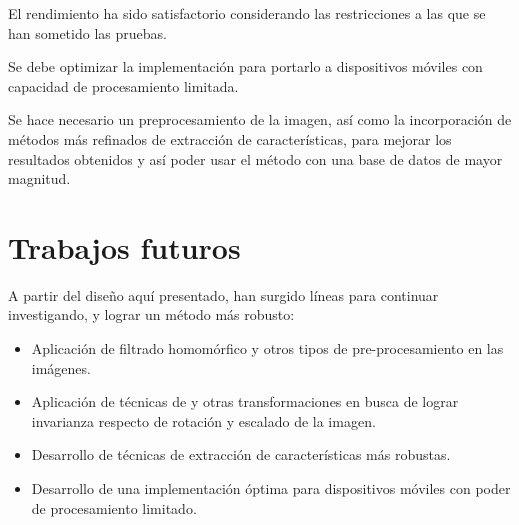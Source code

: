 \documentclass[conference,a4paper,10pt,oneside,final]{tfmpd}
\begin{document}
El rendimiento ha sido satisfactorio considerando las restricciones a las
que se han sometido las pruebas.

Se debe optimizar la implementación para portarlo a dispositivos móviles
con capacidad de procesamiento limitada.

Se hace necesario un preprocesamiento de la imagen, así como la incorporación
de métodos más refinados de extracción de características, para mejorar los
resultados obtenidos y así poder usar el método con una base de datos de
mayor magnitud.
%
%
%
%
\section{Trabajos futuros}
A partir del diseño aquí presentado, han surgido líneas para continuar investigando, 
y lograr un método más robusto:
\begin{itemize}
\item Aplicación de filtrado homomórfico y otros tipos de
      pre-procesamiento en las imágenes.
\item Aplicación de técnicas de  y otras transformaciones en busca
      de lograr invarianza respecto de rotación y escalado de la imagen.
\item Desarrollo de técnicas de extracción de características más robustas.
\item Desarrollo de una implementación óptima para dispositivos móviles con
      poder de procesamiento limitado.
\end{itemize}
\nocite{*}


\end{document}
